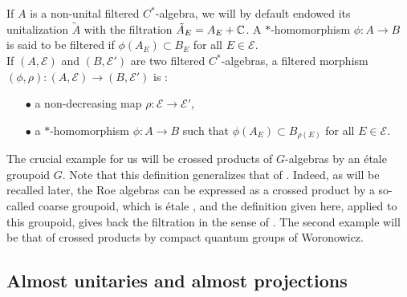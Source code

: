 If $A$ is a non-unital filtered $C^*$-algebra, we will by default endowed its unitalization $\tilde A$ with the filtration $\tilde A_E = A_E + \mathbb C$. A $*$-homomorphism $\phi : A \rightarrow B$ is said to be filtered if $\phi(A_E)\subset B_E$ for all $E\in\mathcal E$.\\

If $(A,\mathcal E)$ and $(B,\mathcal E')$ are two filtered $C^*$-algebras, a filtered morphism $(\phi,\rho): (A,\mathcal E)\rightarrow (B,\mathcal E')$ is :
\begin{itemize}
\item[$\bullet$] a non-decreasing map $\rho : \mathcal E\rightarrow \mathcal E'$,
\item[$\bullet$] a $*$-homomorphism $\phi: A\rightarrow B$ such that $\phi (A_E)\subset B_{\rho(E)}$ for all $E\in\mathcal E$.
\end{itemize}

The crucial example for us will be crossed products of $G$-algebras by an étale groupoid $G$. Note that this definition generalizes that of \cite{OY2}. Indeed, as will be recalled later, the Roe algebras can be expressed as a crossed product by a so-called coarse groupoid, which is étale \cite{SkTuYu}, and the definition given here, applied to this groupoid, gives back the filtration in the sense of \cite{OY2}. The second example will be that of crossed products by compact quantum groups of Woronowicz.\cite{Wo}

\subsection{Almost unitaries and almost projections}

